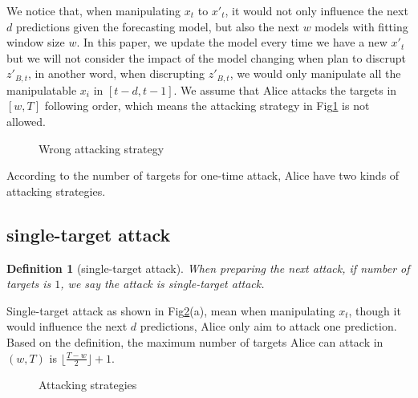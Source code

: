 \documentclass[journal]{IEEEtran}
\newtheorem{definition}{Definition}
\begin{document}
{\color{purple}

We notice that, when manipulating $x_t$ to $x'_t$, it would not only influence the next $d$ predictions given the forecasting model, but also the next $w$ models with fitting window size $w$. In this paper, we update the model every time we have a new $x'_t$ but we will not consider the impact of the model changing when plan to discrupt $z'_{B,t}$, in another word, when discrupting $z'_{B,t}$, we would only manipulate all the manipulatable $x_i$ in $[t-d,t-1]$. We assume that Alice attacks the targets in $[w, T]$ following order, which means the attacking strategy in Fig\ref{fig:wrong1} is not allowed. 

\begin{figure}[htbp!]
\centering
{}
\caption{Wrong attacking strategy}
\label{fig:wrong1}
\end{figure}

According to the number of targets for one-time attack, Alice have two kinds of attacking strategies.


\subsection{single-target attack}

\begin{definition}[single-target attack]
When preparing the next attack, if number of targets is $1$, we say the attack is single-target attack.
\end{definition}
Single-target attack as shown in Fig\ref{fig:stra}(a), mean when manipulating $x_t$, though it would influence the next $d$ predictions, Alice only aim to attack one prediction. Based on the definition, the maximum number of targets Alice can attack in $(w,T)$ is $\lfloor \frac{T-w}{2} \rfloor +1$.

\begin{figure}[htbp!]
\centering
{}

\caption{Attacking strategies}
\label{fig:stra}
\end{figure}


}
\end{document}
